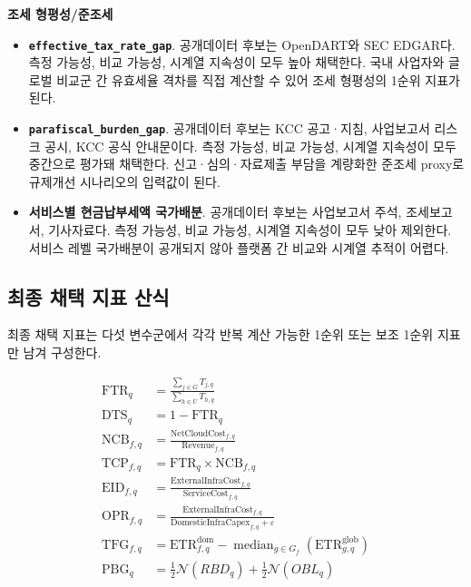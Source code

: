 \documentclass[11pt,a4paper]{report}
\newenvironment{summarylist}{\begin{itemize}[leftmargin=1.8em,itemsep=0.35em,topsep=0.35em]\RaggedRight}{\end{itemize}}
\begin{document}
\noindent\textbf{조세 형평성/준조세}
\begin{summarylist}
  \item \textbf{\texttt{effective\_tax\_rate\_gap}}. 공개데이터 후보는 OpenDART와 SEC EDGAR다. 측정 가능성, 비교 가능성, 시계열 지속성이 모두 높아 채택한다. 국내 사업자와 글로벌 비교군 간 유효세율 격차를 직접 계산할 수 있어 조세 형평성의 1순위 지표가 된다.
  \item \textbf{\texttt{parafiscal\_burden\_gap}}. 공개데이터 후보는 KCC 공고·지침, 사업보고서 리스크 공시, KCC 공식 안내문이다. 측정 가능성, 비교 가능성, 시계열 지속성이 모두 중간으로 평가돼 채택한다. 신고·심의·자료제출 부담을 계량화한 준조세 proxy로 규제개선 시나리오의 입력값이 된다.
  \item \textbf{서비스별 현금납부세액 국가배분}. 공개데이터 후보는 사업보고서 주석, 조세보고서, 기사자료다. 측정 가능성, 비교 가능성, 시계열 지속성이 모두 낮아 제외한다. 서비스 레벨 국가배분이 공개되지 않아 플랫폼 간 비교와 시계열 추적이 어렵다.
\end{summarylist}
\endgroup

\subsection{최종 채택 지표 산식}
최종 채택 지표는 다섯 변수군에서 각각 반복 계산 가능한 1순위 또는 보조 1순위 지표만 남겨 구성한다.

\begin{align}
\mathrm{FTR}_q &= \frac{\sum_{j \in G} T_{j,q}}{\sum_{h \in U} T_{h,q}} \\
\mathrm{DTS}_q &= 1 - \mathrm{FTR}_q \\
\mathrm{NCB}_{f,q} &= \frac{\mathrm{NetCloudCost}_{f,q}}{\mathrm{Revenue}_{f,q}} \\
\mathrm{TCP}_{f,q} &= \mathrm{FTR}_q \times \mathrm{NCB}_{f,q} \\
\mathrm{EID}_{f,q} &= \frac{\mathrm{ExternalInfraCost}_{f,q}}{\mathrm{ServiceCost}_{f,q}} \\
\mathrm{OPR}_{f,q} &= \frac{\mathrm{ExternalInfraCost}_{f,q}}{\mathrm{DomesticInfraCapex}_{f,q} + \varepsilon} \\
\mathrm{TFG}_{f,q} &= \mathrm{ETR}^{\mathrm{dom}}_{f,q} - \operatorname{median}_{g \in G_f}\left(\mathrm{ETR}^{\mathrm{glob}}_{g,q}\right) \\
\mathrm{PBG}_q &= \frac{1}{2}\mathcal{N}(RBD_q) + \frac{1}{2}\mathcal{N}(OBL_q) \label{eq:infra_indicator_formulas}
\end{align}
\end{document}
